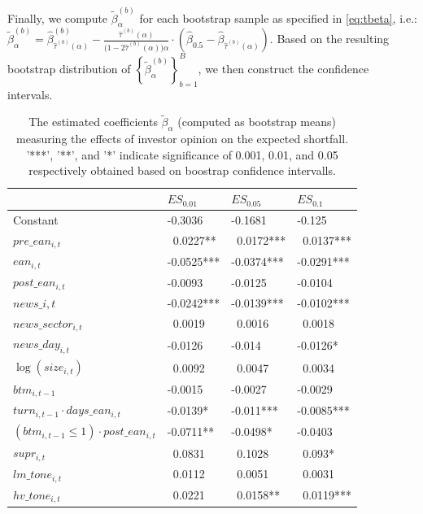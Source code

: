 \documentclass[11pt]{article}
\begin{document}
Finally, we compute \(\tilde\beta^{(b)}_\alpha\) for each bootstrap sample as specified in \eqref{eq:tbeta}, i.e.:
$\tilde\beta^{(b)}_\alpha = \hat \beta^{(b)}_{\hat\tau^{(b)}(\alpha)} - \frac{\hat\tau^{(b)}(\alpha)}{\big(1-2\hat\tau^{(b)}(\alpha)\big)\alpha}\cdot \left(\hat\beta_{0.5} -\hat \beta_{\hat\tau^{(b)}(\alpha)}\right).$
Based on the resulting bootstrap distribution of \(\left\{\tilde\beta^{(b)}_\alpha\right\}_{b=1}^B\), we then construct the confidence intervals.

\begin{table}[h!]

\caption{\label{tab:unnamed-chunk-22}The estimated coefficients $\tilde\beta_\alpha$ (computed as bootstrap means) measuring the effects of investor opinion on the expected shortfall. '***', '**', and '*' indicate significance of 0.001, 0.01, and 0.05 respectively obtained based on boostrap confidence intervalls.}
\centering
\begin{tabular}[t]{l|l|l|l}
\hline
  & $ES_{0.01}$ & $ES_{0.05}$ & $ES_{0.1}$\\
\hline
Constant & -0.3036 & -0.1681 & -0.125\\
\hline
$pre\_ean_{i,t}$& ~0.0227** & ~0.0172*** & ~0.0137***\\
\hline
$ean_{i,t}$  & -0.0525*** & -0.0374*** & -0.0291***\\
\hline
$post\_ean_{i,t}$ & -0.0093 & -0.0125 & -0.0104\\
\hline
$news\_{i,t}$ & -0.0242*** & -0.0139*** & -0.0102***\\
\hline
$news\_sector_{i,t}$  & ~0.0019 & ~0.0016 & ~0.0018\\
\hline
$news\_day_{i,t}$ & -0.0126 & -0.014 & -0.0126*\\
\hline
$\log(size_{i,t})$ & ~0.0092 & ~0.0047 & ~0.0034\\
\hline
$btm_{i,t-1}$ & -0.0015 & -0.0027 & -0.0029\\
\hline
$turn_{i,t-1}\cdot days\_ean_{i,t}$ & -0.0139* & -0.011*** & -0.0085***\\
\hline
$(btm_{i,t-1}\leq 1)\cdot post\_ean_{i,t}$ & -0.0711** & -0.0498* & -0.0403\\
\hline
$supr_{i,t}$& ~0.0831 & ~0.1028 & ~0.093*\\
\hline
$lm\_tone_{i,t}$& ~0.0112 & ~0.0051 & ~0.0031\\
\hline
$hv\_tone_{i,t}$& ~0.0221 & ~0.0158** & ~0.0119***\\
\hline
\end{tabular}
\end{table}
\end{document}
